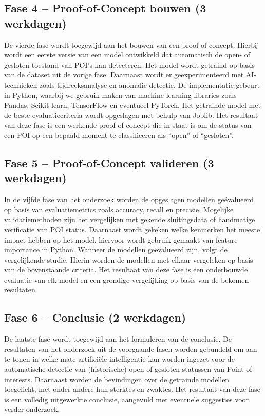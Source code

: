 \subsection{Fase 4 – Proof-of-Concept bouwen (3 werkdagen)}
De vierde fase wordt toegewijd aan het bouwen van een proof-of-concept. Hierbij wordt een eerste versie van een model ontwikkeld dat automatisch de open- of gesloten toestand van POI's kan detecteren. Het model wordt getraind op basis van de dataset uit de vorige fase. Daarnaast wordt er geëxperimenteerd met AI-technieken zoals tijdreeksanalyse en anomalie detectie. De implementatie gebeurt in Python, waarbij we gebruik maken van machine learning libraries zoals Pandas, Scikit-learn, TensorFlow en eventueel PyTorch. Het getrainde model met de beste evaluatiecriteria wordt opgeslagen met behulp van Joblib. Het resultaat van deze fase is een werkende proof-of-concept die in staat is om de status van een POI op een bepaald moment te classificeren als “open” of “gesloten”.

\subsection{Fase 5 – Proof-of-Concept valideren (3 werkdagen)}
In de vijfde fase van het onderzoek worden de opgeslagen modellen geëvalueerd op basis van evaluatiemetrics zoals accuracy, recall en precisie. Mogelijke validatiemethoden zijn het vergelijken met gekende sluitingsdata of handmatige verificatie van POI status. Daarnaast wordt gekeken welke kenmerken het meeste impact hebben op het model. hiervoor wordt gebruik gemaakt van feature importance in Python. Wanneer de modellen geëvalueerd zijn, volgt de vergelijkende studie. Hierin worden de modellen met elkaar vergeleken op basis van de bovenstaande criteria. Het resultaat van deze fase is een onderbouwde evaluatie van elk model en een grondige vergelijking op basis van de bekomen resultaten.

\subsection{Fase 6 – Conclusie (2 werkdagen)}
De laatste fase wordt toegewijd aan het formuleren van de conclusie. De resultaten van het onderzoek uit de voorgaande fasen worden gebundeld om aan te tonen
in welke mate artificiële intelligentie kan worden ingezet voor de automatische detectie van (historische) open of gesloten statussen van Point-of-interests. Daarnaast worden de bevindingen over de getrainde modellen toegelicht, met onder andere hun sterktes en zwaktes. Het resultaat van deze fase is een volledig uitgewerkte conclusie, aangevuld met eventuele suggesties voor verder onderzoek. 

